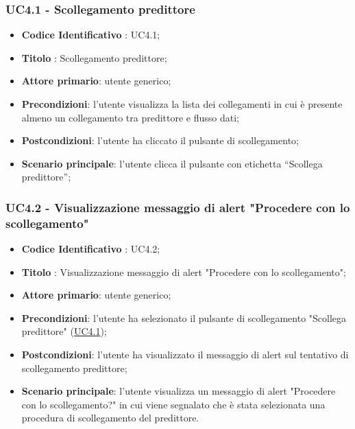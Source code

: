 	\label{par:UC4.1}
	\subsubsection{UC4.1 - Scollegamento predittore}
		\begin{itemize}
			\item\textbf{Codice Identificativo} : UC4.1;
			\item\textbf{Titolo} : Scollegamento predittore;
			\item\textbf{Attore primario}: utente generico;
			\item\textbf{Precondizioni}: l'utente visualizza la lista dei collegamenti in cui è presente almeno un collegamento tra predittore e flusso dati;
			\item\textbf{Postcondizioni}: l'utente ha cliccato il pulsante di scollegamento;
			\item\textbf{Scenario principale}: l'utente clicca il pulsante con etichetta “Scollega predittore”;
			\end{itemize}
		
	\label{par:UC4.2}
	\subsubsection{UC4.2 - Visualizzazione messaggio di alert "Procedere con lo scollegamento"}
		\begin{itemize}
			\item\textbf{Codice Identificativo} : UC4.2;
			\item\textbf{Titolo} : Visualizzazione messaggio di alert "Procedere con lo scollegamento";
			\item\textbf{Attore primario}: utente generico;
			\item\textbf{Precondizioni}: l'utente ha selezionato il pulsante di scollegamento "Scollega predittore" (\hyperref[par:UC4.1]{UC4.1});
			\item\textbf{Postcondizioni}: l'utente ha visualizzato il messaggio di alert sul tentativo di scollegamento predittore;
					
			\item\textbf{Scenario principale}: l'utente visualizza un messaggio di alert "Procedere con lo scollegamento?" in cui viene segnalato che è stata selezionata una procedura di scollegamento del predittore.
	
		\end{itemize}		
		
	\label{par:UC4.3}
